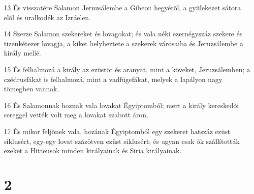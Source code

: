 \par 13 És visszatére Salamon Jeruzsálembe a Gibeon hegyérõl, a gyülekezet sátora elõl és uralkodék az Izráelen.
\par 14 Szerze Salamon szekereket és lovagokat; és vala néki ezernégyszáz szekere és tizenkétezer lovagja, a kiket helyheztete a szekerek városaiba és Jeruzsálembe a király mellé.
\par 15 És felhalmozá a király az ezüstöt és aranyat, mint a köveket, Jeruzsálemben; a czédrusfákat is felhalmozá, mint a vadfügefákat, melyek a lapályon nagy tömegben vannak.
\par 16 És Salamonnak hoznak vala lovakat Égyiptomból; mert a király kereskedõi sereggel vették volt meg a lovakat szabott áron.
\par 17 És mikor feljõnek vala, hozának Égyiptomból egy szekeret hatszáz ezüst siklusért, egy-egy lovat százötven ezüst siklusért; és ugyan csak õk szállították ezeket a Hitteusok minden királyainak és Siria királyainak.

\chapter{2}

